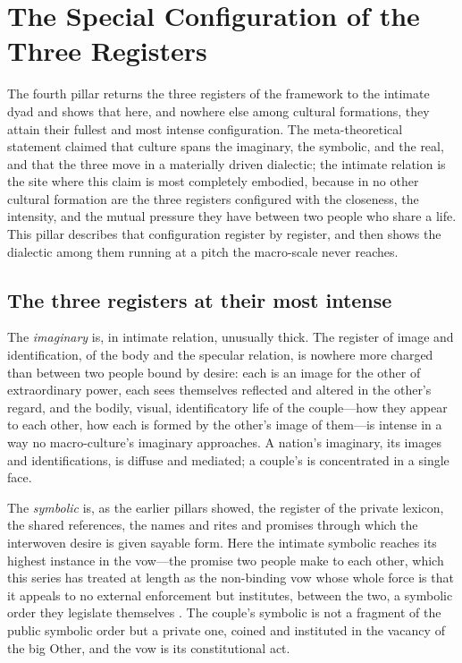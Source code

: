 \section{The Special Configuration of the Three Registers}
\label{p24:sec:registers}

\noindent
The fourth pillar returns the three registers of the framework to the intimate dyad and shows that here, and nowhere else among cultural formations, they attain their fullest and most intense configuration. The meta-theoretical statement claimed that culture spans the imaginary, the symbolic, and the real, and that the three move in a materially driven dialectic; the intimate relation is the site where this claim is most completely embodied, because in no other cultural formation are the three registers configured with the closeness, the intensity, and the mutual pressure they have between two people who share a life. This pillar describes that configuration register by register, and then shows the dialectic among them running at a pitch the macro-scale never reaches.

\subsection*{The three registers at their most intense}

The \emph{imaginary} is, in intimate relation, unusually thick. The register of image and identification, of the body and the specular relation, is nowhere more charged than between two people bound by desire: each is an image for the other of extraordinary power, each sees themselves reflected and altered in the other's regard, and the bodily, visual, identificatory life of the couple---how they appear to each other, how each is formed by the other's image of them---is intense in a way no macro-culture's imaginary approaches. A nation's imaginary, its images and identifications, is diffuse and mediated; a couple's is concentrated in a single face.

The \emph{symbolic} is, as the earlier pillars showed, the register of the private lexicon, the shared references, the names and rites and promises through which the interwoven desire is given sayable form. Here the intimate symbolic reaches its highest instance in the vow---the promise two people make to each other, which this series has treated at length as the non-binding vow whose whole force is that it appeals to no external enforcement but institutes, between the two, a symbolic order they legislate themselves \parencite{paperxiii}. The couple's symbolic is not a fragment of the public symbolic order but a private one, coined and instituted in the vacancy of the big Other, and the vow is its constitutional act.

